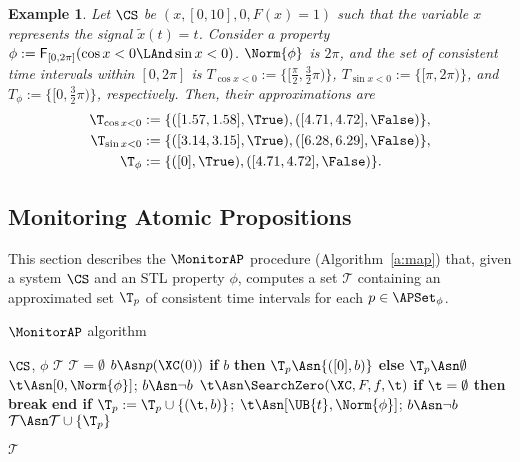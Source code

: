 \documentclass[paper]{ieice}
\newcommand{\Eventually}{\mathsf{F}}
\newtheorem{example}{Example}
\begin{document}
\begin{example} \label{ex:approx}
	Let $\CS$ be $(x, [0,10], 0, F(x) = 1)$ such that
	the variable $x$ represents the signal $\tilde{x}(t) = t$.
	Consider a property
$\phi := \Eventually_{[0,2\pi]} (\cos x<0 \LAnd \sin x<0)$.
$\Norm{\phi}$ is $2\pi$, and 
	the set of consistent time intervals within $[0,2\pi]$ is
	$T_{\cos x<0} := \{ [\frac{\pi}{2},\frac{3}{2} \pi) \}$, 
	$T_{\sin x<0} := \{ [\pi,2\pi) \}$, and
	$T_\phi := \{ [0, \frac{3}{2} \pi) \}$, respectively.
	Then, their approximations are
	\begin{align*}
		\T_{\cos x<0} & := \{([1.57,1.58],\True), ([4.71,4.72],\False)\}, \\
		\T_{\sin x<0} & := \{([3.14,3.15],\True), ([6.28,6.29],\False)\}, \\
		\T_\phi &:= \{ ([0],\True), ([4.71,4.72],\False) \}.
	\end{align*}
\end{example}


\subsection{Monitoring Atomic Propositions}
\label{s:method:map}

This section describes the $\MonitorAP$ procedure (Algorithm~\ref{a:map}) that,
given a system $\CS$ and an STL property $\phi$, computes a set $\mathcal{T}$ containing an approximated set $\T_p$ of consistent time intervals for each $p \in \APSet_\phi$.

\begin{algorithm}[t]
\caption{$\MonitorAP$ algorithm}
\label{a:map}
\begin{algorithmic}[1]
  \REQUIRE $\CS$, $\phi$
  \ENSURE $\mathcal{T}$
\STATE $\mathcal{T} = \emptyset$
  \STATE $b \Asn p(\XC(0))$
  \STATE \textbf{if} $b$ \textbf{then} $\T_p \Asn \{([0],b)\}$ \textbf{else} $\T_p \Asn \emptyset$
  \STATE $\t \Asn [0,\Norm{\phi}]$; \quad $b \Asn \neg b$
  \LOOP
  \STATE $\t \Asn \SearchZero(\XC, F, f, \t)$
  \STATE \textbf{if} $\t = \emptyset$ \textbf{then} \textbf{break} \textbf{end if}
  \STATE 
  $\T_p := \T_p \cup \{(\t,b)\}$; \quad
  $\t \Asn [\UB{t}, \Norm{\phi}]$; \quad $b \Asn \neg b$
  \ENDLOOP
  \STATE $\mathcal{T} \Asn \mathcal{T} \cup \{\T_p\}$
  \ENDFOR

  \vspace{.5em}
  \RETURN $\mathcal{T}$
\end{algorithmic}
\end{algorithm}
\end{document}
